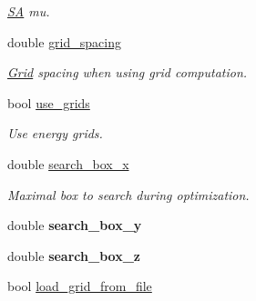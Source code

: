 \begin{DoxyCompactItemize}
\begin{DoxyCompactList}\small\item\em \hyperlink{classSA}{SA} mu. \item\end{DoxyCompactList}\item 
\hypertarget{classPARSER_a1d7e3a2a1ae04b12080169dafbc25f67}{
double \hyperlink{classPARSER_a1d7e3a2a1ae04b12080169dafbc25f67}{grid\_\-spacing}}
\label{classPARSER_a1d7e3a2a1ae04b12080169dafbc25f67}

\begin{DoxyCompactList}\small\item\em \hyperlink{classGrid}{Grid} spacing when using grid computation. \item\end{DoxyCompactList}\item 
\hypertarget{classPARSER_aafe1aeb46fba4bbdd786ae8a3a69b65e}{
bool \hyperlink{classPARSER_aafe1aeb46fba4bbdd786ae8a3a69b65e}{use\_\-grids}}
\label{classPARSER_aafe1aeb46fba4bbdd786ae8a3a69b65e}

\begin{DoxyCompactList}\small\item\em Use energy grids. \item\end{DoxyCompactList}\item 
\hypertarget{classPARSER_a14e80febc60e4ad65bf8e7d2056b080e}{
double \hyperlink{classPARSER_a14e80febc60e4ad65bf8e7d2056b080e}{search\_\-box\_\-x}}
\label{classPARSER_a14e80febc60e4ad65bf8e7d2056b080e}

\begin{DoxyCompactList}\small\item\em Maximal box to search during optimization. \item\end{DoxyCompactList}\item 
\hypertarget{classPARSER_a7eaa6173ff254186fba36df1c2c09dd3}{
double {\bfseries search\_\-box\_\-y}}
\label{classPARSER_a7eaa6173ff254186fba36df1c2c09dd3}

\item 
\hypertarget{classPARSER_a0b33916e70c2fc0850381a5807489612}{
double {\bfseries search\_\-box\_\-z}}
\label{classPARSER_a0b33916e70c2fc0850381a5807489612}

\item 
\hypertarget{classPARSER_ab7857bb0771c6d5ca2e0f7ff2c98d7d0}{
bool \hyperlink{classPARSER_ab7857bb0771c6d5ca2e0f7ff2c98d7d0}{load\_\-grid\_\-from\_\-file}}
\label{classPARSER_ab7857bb0771c6d5ca2e0f7ff2c98d7d0}


\end{DoxyCompactItemize}
